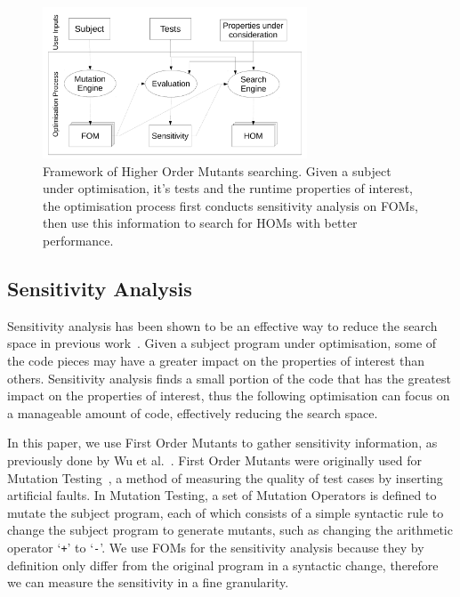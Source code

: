 \documentclass[oribibl]{llncs}
\begin{document}
\begin{figure}[h]
\centering
\includegraphics[width=0.7\textwidth]{framework}
\caption{Framework of Higher Order Mutants searching. Given a subject under optimisation, it's tests and the runtime properties of interest, the optimisation process first conducts sensitivity analysis on FOMs, then use this information to search for HOMs with better performance.}\label{fig_framework}
\end{figure}

\subsection{Sensitivity Analysis}
\label{sec_sensitivity}

Sensitivity analysis has been shown to be an effective way to reduce the search space in previous work~\cite{6733370,Bruce:2015:REC:2739480.2754752,6035728}.
Given a subject program under optimisation, some of the code pieces may have a greater impact on the properties of interest than others.
Sensitivity analysis finds a small portion of the code that has the greatest impact on the properties of interest, thus the following optimisation can focus on a manageable amount of code, effectively reducing the search space.

In this paper, we use First Order Mutants to gather sensitivity information, as previously done by Wu et al.~\cite{Wu:2015:DPO:2739480.2754648}.
First Order Mutants were originally used for Mutation Testing~\cite{demillo1978hints}, a method of measuring the quality of test cases by inserting artificial faults.
In Mutation Testing, a set of Mutation Operators is defined to mutate the subject program, each of which consists of a simple syntactic rule to change the subject program to generate mutants, such as changing the arithmetic operator `\texttt{+}' to `\texttt{-}'.
We use FOMs for the sensitivity analysis because they by definition only differ from the original program in a syntactic change, therefore we can measure the sensitivity in a fine granularity.
\end{document}
